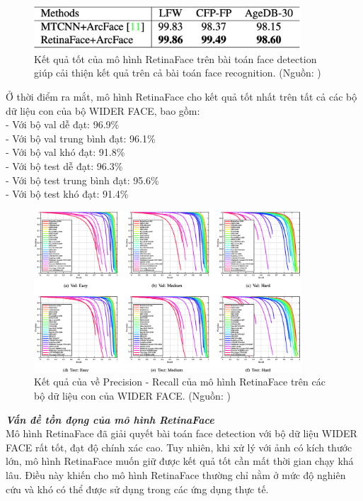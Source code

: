 {    \begin{figure}[H]
        \centering
        \includegraphics[width=10cm] {images/retinaface_results_2}
        \caption{Kết quả tốt của mô hình RetinaFace trên bài toán face detection giúp cải thiện kết quả trên cả bài toán face recognition. (Nguồn: \cite{deng2020retinaface})}
        \label{fig:retinaface_results_2}
    \end{figure}

    \noindent
    Ở thời điểm ra mắt, mô hình RetinaFace cho kết quả tốt nhất trên tất cả các bộ dữ liệu con của bộ WIDER FACE, bao gồm: \\
    - Với bộ val dễ đạt: 96.9\% \\
    - Với bộ val trung bình đạt: 96.1\% \\
    - Với bộ val khó đạt: 91.8\% \\
    - Với bộ test dễ đạt: 96.3\% \\
    - Với bộ test trung bình đạt: 95.6\% \\
    - Với bộ test khó đạt: 91.4\%

    \begin{figure}[H]
        \centering
        \includegraphics[width=10cm] {images/retinaface_results_3}
        \caption{Kết quả của về Precision - Recall của mô hình RetinaFace trên các bộ dữ liệu con của WIDER FACE. (Nguồn: \cite{deng2020retinaface})}
        \label{fig:retinaface_results_3}
    \end{figure}

    \noindent
    \textbf{\textit{Vấn đề tồn đọng của mô hình RetinaFace}} \\
    Mô hình RetinaFace đã giải quyết bài toán face detection với bộ dữ liệu WIDER FACE rất tốt, đạt độ chính xác cao.
    Tuy nhiên, khi xử lý với ảnh có kích thước lớn, mô hình RetinaFace muốn giữ được kết quả tốt cần mất thời gian chạy khá lâu.
    Điều này khiến cho mô hình RetinaFace thường chỉ nằm ở mức độ nghiên cứu và khó có thể được sử dụng trong các ứng dụng thực tế.
}